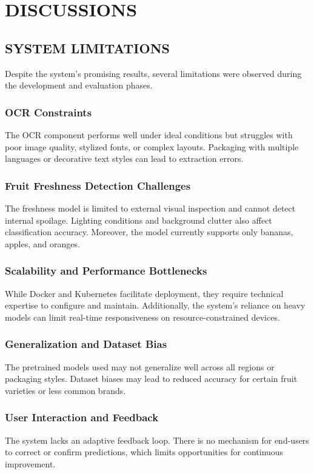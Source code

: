 \documentclass[12pt]{report}
\begin{document}
\section{DISCUSSIONS}

\subsection{SYSTEM LIMITATIONS}

Despite the system's promising results, several limitations were observed during the development and evaluation phases.

\subsubsection{OCR Constraints}
The OCR component performs well under ideal conditions but struggles with poor image quality, stylized fonts, or complex layouts. Packaging with multiple languages or decorative text styles can lead to extraction errors.

\subsubsection{Fruit Freshness Detection Challenges}
The freshness model is limited to external visual inspection and cannot detect internal spoilage. Lighting conditions and background clutter also affect classification accuracy. Moreover, the model currently supports only bananas, apples, and oranges.

\subsubsection{Scalability and Performance Bottlenecks}
While Docker and Kubernetes facilitate deployment, they require technical expertise to configure and maintain. Additionally, the system's reliance on heavy models can limit real-time responsiveness on resource-constrained devices.

\subsubsection{Generalization and Dataset Bias}
The pretrained models used may not generalize well across all regions or packaging styles. Dataset biases may lead to reduced accuracy for certain fruit varieties or less common brands.

\subsubsection{User Interaction and Feedback}
The system lacks an adaptive feedback loop. There is no mechanism for end-users to correct or confirm predictions, which limits opportunities for continuous improvement.
\end{document}
